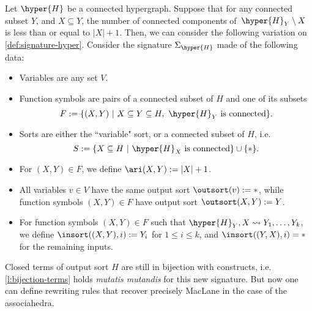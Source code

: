 Let $\hyper{H}$ be a connected hypergraph. 
Suppose that for any connected subset $Y$, and $X \subseteq Y$, the number of connected components of~$\hyper{H}_Y\setminus X$ is less than or equal to $|X|+1$.
Then, we can consider the following variation on \cref{def:signature-hyper}.
Consider the signature $\Sigma_\hyper{H}$ made of the following data: 
\begin{itemize}
  \item Variables are any set $V$. 
  \item Function symbols are pairs of a connected subset of $H$ and one of its subsets 
  $$F:=\{(X,Y) \ | \ X \subseteq Y \subseteq H, \ \hyper{H}_Y \text{ is connected}\}.$$
  \item Sorts are either the ``variable" sort, or a connected subset of $H$, i.e. 
  $$S:=\{ X \subseteq H \ | \ \hyper{H}_X \text{ is connected}\}\cup\{*\}.$$
  \item For $(X,Y) \in F$, we define $\ari(X,Y):=|X|+1$.
  \item All variables $v \in V$ have the same output sort $\outsort(v):=*$, while function symbols $(X,Y) \in F$ have output sort $\outsort(X,Y):=Y$.
  \item For function symbols $(X,Y) \in F$ such that $\hyper{H}_Y,X \leadsto Y_1,\ldots,Y_k$, we define $\insort((X,Y),i):=Y_i$ for $1 \leq i \leq k$, and $\insort((Y,X),i)=*$ for the remaining inputs.
\end{itemize}

Closed terms of output sort $H$ are still in bijection with constructs, i.e. \cref{l:bijection-terms} holds \emph{mutatis mutandis} for this new signature. 
But now one can define rewriting rules that recover precisely MacLane in the case of the associahedra. 








